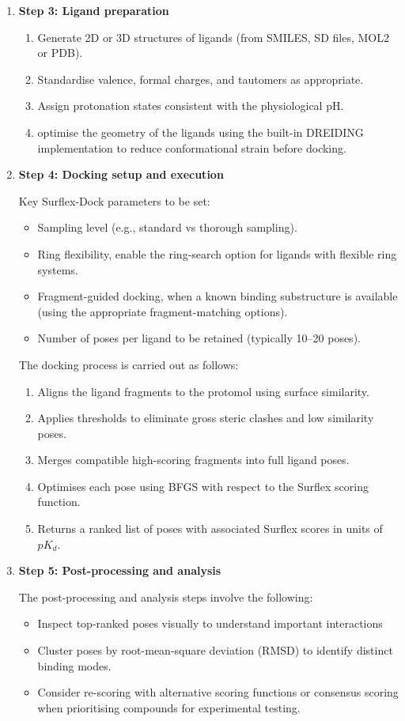 \documentclass[12pt]{article}
\begin{document}
\begin{enumerate}
\item \textbf{Step 3: Ligand preparation}

\begin{enumerate}
  \item Generate 2D or 3D structures of ligands (from SMILES, SD files, MOL2 or PDB).
  \item Standardise valence, formal charges, and tautomers as appropriate.
  \item Assign protonation states consistent with the physiological pH.
  \item optimise the geometry of the ligands using the built-in DREIDING implementation to reduce conformational strain before docking.
\end{enumerate}

\item \textbf{Step 4: Docking setup and execution}

Key Surflex-Dock parameters to be set:
\begin{itemize}
  \item Sampling level (e.g., standard vs thorough sampling).
  \item Ring flexibility, enable the ring-search option for ligands with flexible ring systems.
  \item Fragment-guided docking, when a known binding substructure is available (using the appropriate fragment-matching options).
  \item Number of poses per ligand to be retained (typically 10--20 poses).
\end{itemize}

The docking process is carried out as follows:
\begin{enumerate}
  \item Aligns the ligand fragments to the protomol using surface similarity.
  \item Applies thresholds to eliminate gross steric clashes and low similarity poses.
  \item Merges compatible high-scoring fragments into full ligand poses.
  \item Optimises each pose using BFGS with respect to the Surflex scoring function.
  \item Returns a ranked list of poses with associated Surflex scores in units of $pK_d$.
\end{enumerate}

\item \textbf{Step 5: Post-processing and analysis}

The post-processing and analysis steps involve the following:
\begin{itemize}
  \item Inspect top-ranked poses visually to understand important interactions
  \item Cluster poses by root-mean-square deviation (RMSD) to identify distinct binding modes.
  \item Consider re-scoring with alternative scoring functions or consensus scoring when prioritising compounds for experimental testing.
\end{itemize}
\end{enumerate}
\end{document}
